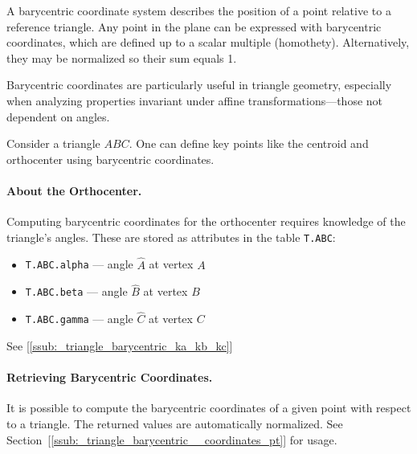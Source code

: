 A barycentric coordinate system describes the position of a point relative to a reference triangle. Any point in the plane can be expressed with barycentric coordinates, which are defined up to a scalar multiple (homothety). Alternatively, they may be normalized so their sum equals 1.

Barycentric coordinates are particularly useful in triangle geometry, especially when analyzing properties invariant under affine transformations—those not dependent on angles.

Consider a triangle $ABC$. One can define key points like the centroid and orthocenter using barycentric coordinates.

\paragraph{About the Orthocenter.}
Computing barycentric coordinates for the orthocenter requires knowledge of the triangle's angles. These are stored as attributes in the table \texttt{T.ABC}:
\begin{itemize}
  \item \texttt{T.ABC.alpha} — angle $\widehat{A}$ at vertex $A$
  \item \texttt{T.ABC.beta}  — angle $\widehat{B}$ at vertex $B$
  \item \texttt{T.ABC.gamma} — angle $\widehat{C}$ at vertex $C$
\end{itemize}

See  [\ref{ssub:_triangle_barycentric_ka_kb_kc}]

\paragraph{Retrieving Barycentric Coordinates.}
It is possible to compute the barycentric coordinates of a given point with respect to a triangle. The returned values are automatically normalized. See Section~[\ref{ssub:_triangle_barycentric__coordinates_pt}] for usage.


\begin{minipage}{.5\textwidth}
\end{minipage}
\begin{minipage}{.5\textwidth}
\begin{tkzexample}
\end{tkzexample}
\end{minipage}

